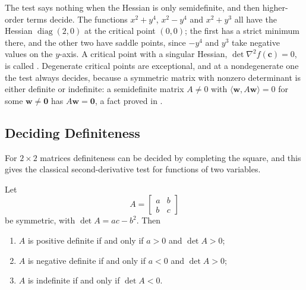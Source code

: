 The test says nothing when the Hessian is only semidefinite, and then higher-order terms decide. The functions $x^2+y^4$, $x^2-y^4$ and $x^2+y^3$ all have the Hessian $\operatorname{diag}(2,0)$ at the critical point $(0,0)$; the first has a strict minimum there, and the other two have saddle points, since $-y^4$ and $y^3$ take negative values on the $y$-axis. A critical point with a singular Hessian, $\det\nabla^2f(\mathbf c)=0$, is called . Degenerate critical points are exceptional, and at a nondegenerate one the test always decides, because a symmetric matrix with nonzero determinant is either definite or indefinite: a semidefinite matrix $A\ne0$ with $\langle\mathbf w,A\mathbf w\rangle=0$ for some $\mathbf w\ne\mathbf0$ has $A\mathbf w=\mathbf0$, a fact proved in .

\subsection{Deciding Definiteness}

For $2\times2$ matrices definiteness can be decided by completing the square, and this gives the classical second-derivative test for functions of two variables.

\begin{proposition}
\label{prop:definite-2x2}
Let
\[
A=\begin{bmatrix}a&b\\b&c\end{bmatrix}
\]
be symmetric, with $\det A=ac-b^2$. Then
\begin{enumerate}
\item $A$ is positive definite if and only if $a>0$ and $\det A>0$;
\item $A$ is negative definite if and only if $a<0$ and $\det A>0$;
\item $A$ is indefinite if and only if $\det A<0$.
\end{enumerate}
\end{proposition}

